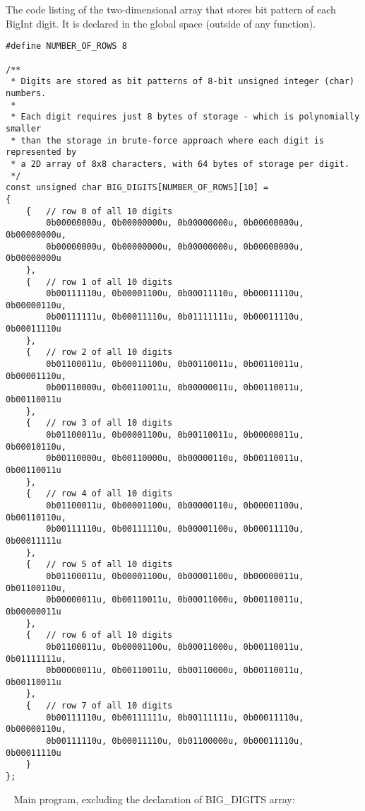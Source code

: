 \documentclass{article}
\begin{document}
\paragraph{}\

	
	\noindent The code listing of the two-dimensional array that stores bit pattern of each BigInt digit. It is declared in the global space (outside of any function).
	
	\begin{verbatim}
#define NUMBER_OF_ROWS 8

/**
 * Digits are stored as bit patterns of 8-bit unsigned integer (char) numbers.
 *
 * Each digit requires just 8 bytes of storage - which is polynomially smaller
 * than the storage in brute-force approach where each digit is represented by
 * a 2D array of 8x8 characters, with 64 bytes of storage per digit.
 */
const unsigned char BIG_DIGITS[NUMBER_OF_ROWS][10] = 
{
    {   // row 0 of all 10 digits
        0b00000000u, 0b00000000u, 0b00000000u, 0b00000000u, 0b00000000u,
        0b00000000u, 0b00000000u, 0b00000000u, 0b00000000u, 0b00000000u
    },
    {   // row 1 of all 10 digits
        0b00111110u, 0b00001100u, 0b00011110u, 0b00011110u, 0b00000110u,
        0b00111111u, 0b00011110u, 0b01111111u, 0b00011110u, 0b00011110u
    },
    {   // row 2 of all 10 digits
        0b01100011u, 0b00011100u, 0b00110011u, 0b00110011u, 0b00001110u,
        0b00110000u, 0b00110011u, 0b00000011u, 0b00110011u, 0b00110011u
    },
    {   // row 3 of all 10 digits
        0b01100011u, 0b00001100u, 0b00110011u, 0b00000011u, 0b00010110u,
        0b00110000u, 0b00110000u, 0b00000110u, 0b00110011u, 0b00110011u
    },
    {   // row 4 of all 10 digits
        0b01100011u, 0b00001100u, 0b00000110u, 0b00001100u, 0b00110110u,
        0b00111110u, 0b00111110u, 0b00001100u, 0b00011110u, 0b00011111u
    },
    {   // row 5 of all 10 digits
        0b01100011u, 0b00001100u, 0b00001100u, 0b00000011u, 0b01100110u,
        0b00000011u, 0b00110011u, 0b00011000u, 0b00110011u, 0b00000011u
    },
    {   // row 6 of all 10 digits
        0b01100011u, 0b00001100u, 0b00011000u, 0b00110011u, 0b01111111u,
        0b00000011u, 0b00110011u, 0b00110000u, 0b00110011u, 0b00110011u
    },
    {   // row 7 of all 10 digits
        0b00111110u, 0b00111111u, 0b00111111u, 0b00011110u, 0b00000110u,
        0b00111110u, 0b00011110u, 0b01100000u, 0b00011110u, 0b00011110u
    }
};
	\end{verbatim}
	
	\rmfamily\
	\newline
	\noindent Main program, excluding the declaration of BIG_DIGITS array:
	
\end{document}
